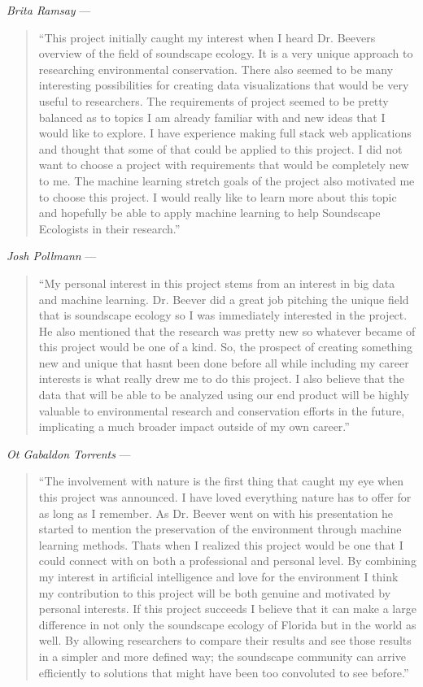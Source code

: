 \noindent\textit{Brita Ramsay} ---
\begin{quote}
``This project initially caught my interest when I heard Dr. Beever\textquotesingle s overview of the field of soundscape ecology. It is a very unique approach to researching environmental conservation. There also seemed to be many interesting possibilities for creating data visualizations that would be very useful to researchers. The requirements of project seemed to be pretty balanced as to topics I am already familiar with and new ideas that I would like to explore. I have experience making full stack web applications and thought that some of that could be applied to this project. I did not want to choose a project with requirements that would be completely new to me. The machine learning stretch goals of the project also motivated me to choose this project. I would really like to learn more about this topic and hopefully be able to apply machine learning to help Soundscape Ecologists in their research.''
\end{quote}

\noindent\textit{Josh Pollmann} ---
\begin{quote}
``My personal interest in this project stems from an interest in big data and machine learning. Dr. Beever did a great job pitching the unique field that is soundscape ecology so I was immediately interested in the project. He also mentioned that the research was pretty new so whatever became of this project would be one of a kind. So, the prospect of creating something new and unique that hasn\textquotesingle t been done before all while including my career interests is what really drew me to do this project. I also believe that the data that will be able to be analyzed using our end product will be highly valuable to environmental research and conservation efforts in the future, implicating a much broader impact outside of my own career.''
\end{quote}

\noindent\textit{Ot Gabaldon Torrents} ---
\begin{quote}
``The involvement with nature is the first thing that caught my eye when this project was announced. I have loved everything nature has to offer for as long as I remember. As Dr. Beever went on with his presentation he started to mention the preservation of the environment through machine learning methods. That\textquotesingle s when I realized this project would be one that I could connect with on both a professional and personal level. By combining my interest in artificial intelligence and love for the environment I think my contribution to this project will be both genuine and motivated by personal interests. If this project succeeds I believe that it can make a large difference in not only the soundscape ecology of Florida but in the world as well. By allowing researchers to compare their results and see those results in a simpler and more defined way; the soundscape community can arrive efficiently to solutions that might have been too convoluted to see before.''
\end{quote}

